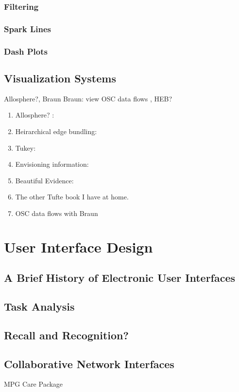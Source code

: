 		\subsubsection{Filtering}
		\subsubsection{Spark Lines}
		\subsubsection{Dash Plots}
	\subsection{Visualization Systems}
		Allosphere?, Braun Braun: view OSC data flows , HEB?
	\begin{enumerate}
		\item Allosphere? :
		\item Heirarchical edge bundling: 
		\item Tukey: 
		\item Envisioning information: 
		\item Beautiful Evidence: 
		\item The other Tufte book I have at home.
		\item OSC data flows with Braun 
	\end{enumerate}

\section{User Interface Design}
	\subsection{A Brief History of Electronic User Interfaces}
	\subsection{Task Analysis}
	\subsection{Recall and Recognition?}
	\subsection{Collaborative Network Interfaces}
		MPG Care Package 
